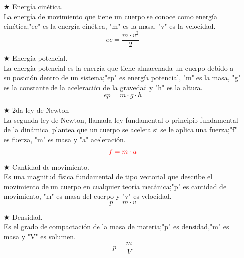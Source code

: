 \documentclass[letterpaper,pt12]{article}
\begin{document}
\begin{itemize}
\item [$\bigstar$]{Energía cinética.}\\
La energía de movimiento que tiene un cuerpo se conoce como energía cinética;"ec" es la energía cinética, "m" es la masa, "v" es la velocidad.
\begin{equation*}
    ec=\frac{m\cdot v^2}{2}
\end{equation*}

\item [$\bigstar$]{Energía potencial.}\\
La energía potencial es la energía que tiene almacenada un cuerpo debido a su posición dentro de un sistema;"ep" es energía potencial, "m" es la masa, "g" es la constante de la aceleración de la gravedad y "h" es la altura.
\begin{equation*}
    ep=m\cdot g\cdot h
\end{equation*}

\item [$\bigstar$]{2da ley de Newton}\\
La segunda ley de Newton, llamada ley fundamental o principio fundamental de la dinámica, plantea que un cuerpo se acelera si se le aplica una fuerza;"f" es fuerza, "m" es masa y "a" aceleración.
\begin{equation*}
    \textcolor{red}{f=m\cdot a}
\end{equation*}

\item [$\bigstar$]{Cantidad de movimiento.}\\
Es una magnitud física fundamental de tipo vectorial que describe el movimiento de un cuerpo en cualquier teoría mecánica;"p" es cantidad de movimiento, "m" es masa del cuerpo y "v" es velocidad.
\begin{equation*}
    p=m\cdot v
\end{equation*}

\item [$\bigstar$]{Densidad.}\\
Es el grado de compactación de la masa de materia;"p" es densidad,"m" es masa y "V" es volumen.
\begin{equation*}
    p=\frac{m}{V}
\end{equation*}
\end{itemize}

\pagestyle{fancy}

\fancyhf{}
 \rfoot{\thepage}
\end{document}
